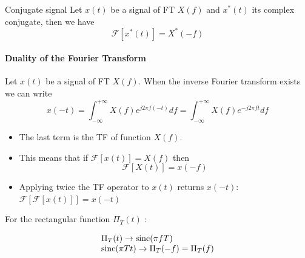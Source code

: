     
    
    \begin{block}{Conjugate signal}
      Let $x(t)$  be a signal of FT $X(f)$ and
      $x^*(t)$ its complex conjugate, then we have
    $$
    \mathcal{F}[x^*(t)] = X^*(-f)
    $$
    \end{block}


    \paragraph{Duality of the Fourier Transform}
    

Let $x(t)$ be a signal of FT $X(f)$. 
When the inverse Fourier transform exists we can write
$$
x(-t)= \int_{-\infty}^{+\infty} X(f) e^{j2 \pi f (-t) } 
df = \int_{-\infty}^{+\infty} X(f) e^{-j2 \pi f t } 
df 
$$

\begin{itemize}
  \item The last term is the TF of function $X(f)$.
  \item This means that if $ \mathcal{F}[x(t)]=X(f)$ then
  $$ \mathcal{F}[X(t)]= x(-f)$$
  \item Applying twice the TF operator to $x(t)$ returns $x(-t)$: 
  \ $ \mathcal{F}[\mathcal{F}[x(t)]]=x(-t)$
\end{itemize}




     For the rectangular function $ \Pi_T(t)$ : 

$$
\begin{array}{l}
  \Pi_T(t) \rightarrow  \text{sinc}(\pi f T) \\
  \text{sinc}(\pi T t )\rightarrow {\Pi_T(-f) = \Pi_T(f)}
\end{array}
$$


